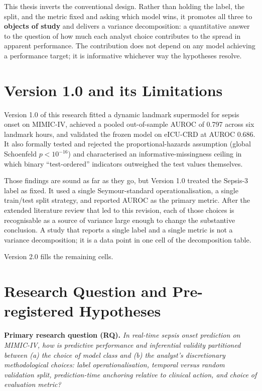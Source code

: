 This thesis inverts the conventional design. Rather than holding the label,
the split, and the metric fixed and asking which model wins, it promotes all
three to \textbf{objects of study} and delivers a variance decomposition: a
quantitative answer to the question of how much each analyst choice contributes
to the spread in apparent performance. The contribution does not depend on any
model achieving a performance target; it is informative whichever way the
hypotheses resolve.

\section{Version 1.0 and its Limitations}

Version 1.0 of this research \parencite{ahad2025v1thesis} fitted a dynamic
landmark supermodel for sepsis onset on MIMIC-IV, achieved a pooled out-of-sample
AUROC of 0.797 across six landmark hours, and validated the frozen model on
eICU-CRD at AUROC 0.686. It also formally tested and rejected the
proportional-hazards assumption (global Schoenfeld $p < 10^{-16}$) and
characterised an informative-missingness ceiling in which binary ``test-ordered''
indicators outweighed the test values themselves.

Those findings are sound as far as they go, but Version 1.0 treated the Sepsis-3
label as fixed. It used a single Seymour-standard operationalisation, a single
train/test split strategy, and reported AUROC as the primary metric. After the
extended literature review that led to this revision, each of those choices is
recognisable as a source of variance large enough to change the substantive
conclusion. A study that reports a single label and a single metric is not a
variance decomposition; it is a data point in one cell of the decomposition table.

Version 2.0 fills the remaining cells.

\section{Research Question and Pre-registered Hypotheses}
\label{sec:rq}

\noindent\textbf{Primary research question (RQ).} \textit{In real-time sepsis
onset prediction on MIMIC-IV, how is predictive performance and inferential
validity partitioned between (a) the choice of model class and (b) the analyst's
discretionary methodological choices: label operationalisation, temporal versus
random validation split, prediction-time anchoring relative to clinical action,
and choice of evaluation metric?}

